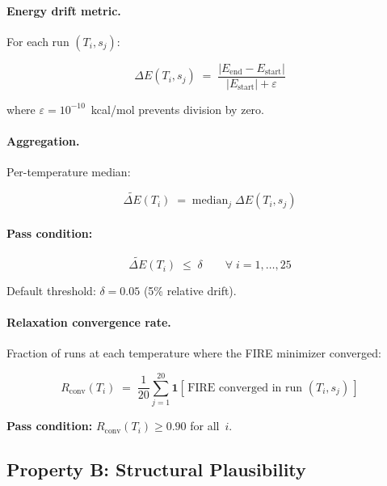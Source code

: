 \documentclass[11pt]{article}
\begin{document}
\paragraph{Energy drift metric.} For each run $(T_i, s_j)$:

\begin{equation}
\label{eq:drift}
\Delta E(T_i, s_j) \;=\;
\frac{|E_{\mathrm{end}} - E_{\mathrm{start}}|}
     {|E_{\mathrm{start}}| + \varepsilon}
\end{equation}

where $\varepsilon = 10^{-10}$~kcal/mol prevents division by zero.

\paragraph{Aggregation.} Per-temperature median:

\begin{equation}
\widetilde{\Delta E}(T_i) \;=\; \mathrm{median}_{j}\;\Delta E(T_i, s_j)
\end{equation}

\paragraph{Pass condition:}
\begin{equation}
\label{eq:drift_pass}
\widetilde{\Delta E}(T_i) \;\le\; \delta \qquad \forall\; i = 1,\ldots,25
\end{equation}

Default threshold: $\delta = 0.05$ (5\% relative drift).

\paragraph{Relaxation convergence rate.} Fraction of runs at each
temperature where the FIRE minimizer converged:

\begin{equation}
R_{\mathrm{conv}}(T_i) \;=\; \frac{1}{20}\sum_{j=1}^{20}
\mathbf{1}\!\left[\,\text{FIRE converged in run } (T_i, s_j)\,\right]
\end{equation}

\textbf{Pass condition:} $R_{\mathrm{conv}}(T_i) \ge 0.90$ for all~$i$.

\subsection{Property B: Structural Plausibility}
\end{document}
